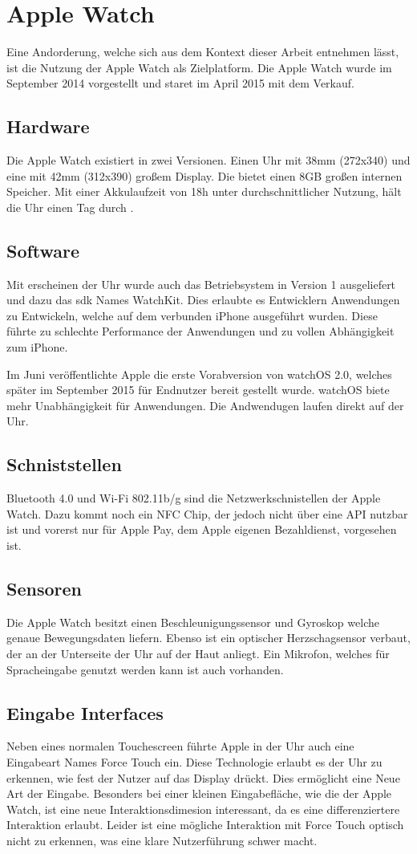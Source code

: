 \section{Apple Watch}
Eine Andorderung, welche sich aus dem Kontext dieser Arbeit entnehmen lässt, ist die Nutzung der Apple Watch als Zielplatform. Die Apple Watch wurde im September 2014 vorgestellt und staret im April 2015 mit dem Verkauf.
\subsection{Hardware}
Die Apple Watch existiert in zwei Versionen. Einen Uhr mit 38mm (272x340) und eine mit 42mm (312x390) großem Display. Die bietet einen 8GB großen internen Speicher. Mit einer Akkulaufzeit von 18h unter durchschnittlicher Nutzung, hält die Uhr einen Tag durch \cite{Riches:2015aa}. 
\subsection{Software}
Mit erscheinen der Uhr wurde auch das Betriebsystem in Version 1 ausgeliefert und dazu das \gls{sdk} Names WatchKit. Dies erlaubte es Entwicklern Anwendungen zu Entwickeln, welche auf dem verbunden iPhone ausgeführt wurden. Diese führte zu schlechte Performance der Anwendungen und zu vollen Abhängigkeit zum iPhone.

Im Juni veröffentlichte Apple die erste Vorabversion von watchOS 2.0, welches später im September 2015 für Endnutzer bereit gestellt wurde. watchOS biete mehr Unabhängigkeit für Anwendungen. Die Andwendugen laufen direkt auf der Uhr.
\subsection{Schniststellen}
Bluetooth 4.0 und Wi-Fi 802.11b/g sind die Netzwerkschnistellen der Apple Watch. Dazu kommt noch ein NFC Chip, der jedoch nicht über eine API nutzbar ist und vorerst nur für Apple Pay, dem Apple eigenen Bezahldienst, vorgesehen ist\cite{RITCHIE:2015aa}. 
\subsection{Sensoren}
Die Apple Watch besitzt einen Beschleunigungssensor und Gyroskop welche genaue Bewegungsdaten liefern. Ebenso ist ein optischer Herzschagsensor verbaut, der an der Unterseite der Uhr auf der Haut anliegt. Ein Mikrofon, welches für Spracheingabe genutzt werden kann ist auch vorhanden.
\subsection{Eingabe Interfaces}
Neben eines normalen Touchescreen führte Apple in der Uhr auch eine Eingabeart Names Force Touch ein. Diese Technologie erlaubt es der Uhr zu erkennen, wie fest der Nutzer auf das Display drückt. Dies ermöglicht eine Neue Art der Eingabe. Besonders bei einer kleinen Eingabefläche, wie die der Apple Watch, ist eine neue Interaktionsdimesion interessant, da es eine differenziertere Interaktion erlaubt. Leider ist eine mögliche Interaktion mit Force Touch optisch nicht zu erkennen, was eine klare Nutzerführung schwer macht.

